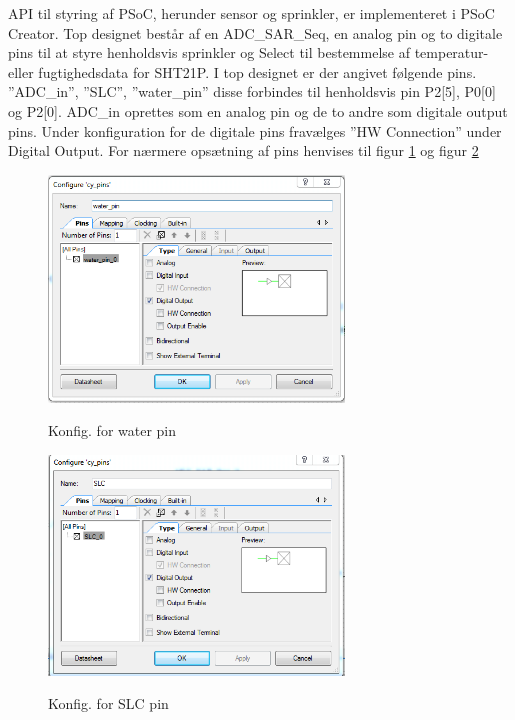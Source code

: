 
API til styring af PSoC, herunder sensor og sprinkler, er implementeret i PSoC Creator. Top designet består af en ADC\_SAR\_Seq, en analog pin og to digitale pins til at styre henholdsvis sprinkler og Select til bestemmelse af temperatur- eller fugtighedsdata for SHT21P.
I top designet er der angivet følgende pins. ''ADC\_in'', ''SLC'', ''water\_pin'' disse forbindes til henholdsvis pin P2[5], P0[0] og P2[0]. ADC\_in oprettes som en analog pin og de to andre som digitale output pins. Under konfiguration for de digitale pins fravælges ''HW Connection'' under Digital Output. For nærmere opsætning af pins henvises til figur \ref{lab:water_pin_konfig} og figur \ref{lab:SLC_pin_konfig}

\begin{figure}[htb]
\centering
{\includegraphics[width=0.70\textwidth]{filer/pics/water_pin_konfig.png}}
\caption{Konfig. for water pin}
\label{lab:water_pin_konfig}
\end{figure}


\begin{figure}[htb]
\centering
{\includegraphics[width=0.70\textwidth]{filer/pics/SLC_pin_konfig.png}}
\caption{Konfig. for SLC pin}
\label{lab:SLC_pin_konfig}
\end{figure}  

